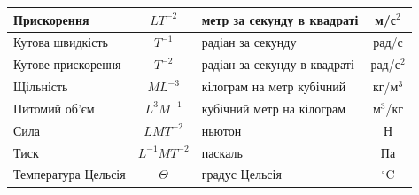 \begin{table}[h]
\begin{tabular}{|>{\raggedright}m{5cm}|c|m{4cm}|c|}
Прискорення & $LT^{-2}$ & метр за секунду в квадраті & м/с$^2$\\[0pt]\hline\vspace{4pt}
Кутова швидкість & $T^{-1}$ & радіан за секунду & рад/с \\[0pt]\hline\vspace{4pt}
Кутове прискорення & $T^{-2}$ & радіан за секунду в квадраті & рад/с$^2$ \\[0pt]\hline\vspace{4pt}
Щільність & $ML^{-3}$ & кілограм на метр кубічний & кг/м$^3$ \\[0pt]\hline\vspace{4pt}
Питомий об'єм & $L^3M^{-1}$ & кубічний метр на кілограм & м$^3$/кг \\[0pt]\hline\vspace{4pt}
Сила & $LMT^{-2}$ & ньютон & Н \\[0pt]\hline\vspace{4pt}
Тиск & $L^{-1}MT^{-2}$ & паскаль & Па \\[0pt]\hline\vspace{4pt}
Температура Цельсія & $\Theta$ & градус Цельсія & $^\circ$C \\[0pt]\hline 
\end{tabular}
\end{table}